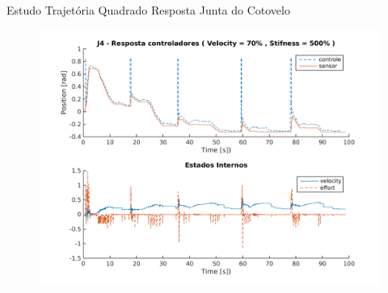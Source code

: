 \documentclass{beamer}
\begin{document}
\begin{frame}{Estudo Trajetória Quadrado}
Resposta Junta do Cotovelo
\begin{figure}
    \centering
    \includegraphics[width = 0.8\linewidth]{tex/figs/squareStiffJ3stateEval_J4v70s500.png}
    \label{fig:mekademo}
\end{figure}
\end{frame}
\end{document}
